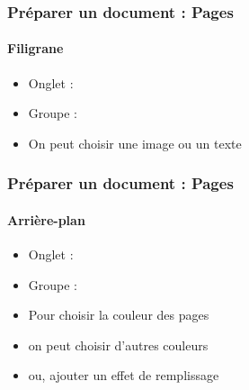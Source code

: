 \documentclass[xcolor=table]{beamer}
\begin{document}
\begin{frame}[t]
\frametitle{Préparer un document : Pages}
\framesubtitle{Filigrane}

\begin{minipage}{0.49\textwidth}
	\begin{itemize}
		\item Onglet : 
		\item Groupe : 
		\item On peut choisir une image ou un texte 
	\end{itemize}
\end{minipage}
\begin{minipage}{0.50\textwidth}
\end{minipage}

\end{frame}

\begin{frame}[t]
\frametitle{Préparer un document : Pages}
\framesubtitle{Arrière-plan}

\begin{minipage}{0.49\textwidth}
	\begin{itemize}
		\item Onglet : 
		\item Groupe : 
		\item Pour choisir la couleur des pages
		\item on peut choisir d'autres couleurs 
		\item ou, ajouter un effet de remplissage
	\end{itemize}
\end{minipage}
\begin{minipage}{0.50\textwidth}
	\vspace{1cm}
\end{minipage}

\end{frame}
\end{document}
